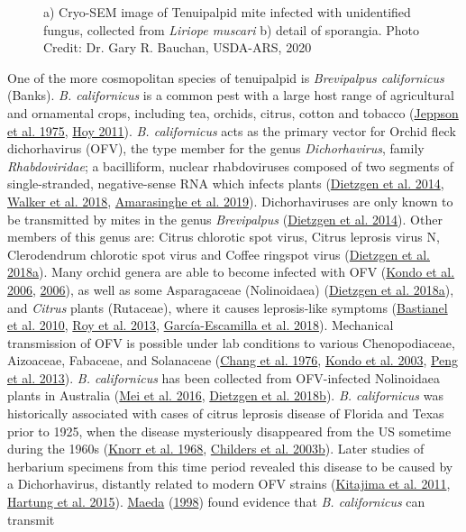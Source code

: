 \documentclass[12pt,final,CPage]{ufthesis}
\begin{document}
{\begin{figure}
  \caption[Cryo-SEM image of Tenuipalpid mite infected with unidentified fungus]{a) Cryo-SEM image of Tenuipalpid mite infected with unidentified fungus, collected from \textit{Liriope muscari} b) detail of sporangia. Photo Credit: Dr. Gary R. Bauchan, USDA-ARS, 2020}\label{fig:brevi-fungus}
  \end{figure}
  One of the more cosmopolitan species of tenuipalpid is \emph{Brevipalpus californicus} (Banks). \emph{B. californicus} is a common pest with a large host range of agricultural and ornamental crops, including tea, orchids, citrus, cotton and tobacco (\protect\hyperlink{ref-Jeppson1975}{Jeppson et al. 1975}, \protect\hyperlink{ref-Hoy2011}{Hoy 2011}). \emph{B. californicus} acts as the primary vector for Orchid fleck dichorhavirus (OFV), the type member for the genus \emph{Dichorhavirus}, family \emph{Rhabdoviridae}; a bacilliform, nuclear rhabdoviruses composed of two segments of single-stranded, negative-sense RNA which infects plants (\protect\hyperlink{ref-Dietzgen2014}{Dietzgen et al. 2014}, \protect\hyperlink{ref-Walker2018}{Walker et al. 2018}, \protect\hyperlink{ref-Amarasinghe2019}{Amarasinghe et al. 2019}). Dichorhaviruses are only known to be transmitted by mites in the genus \emph{Brevipalpus} (\protect\hyperlink{ref-Dietzgen2014}{Dietzgen et al. 2014}). Other members of this genus are: Citrus chlorotic spot virus, Citrus leprosis virus N, Clerodendrum chlorotic spot virus and Coffee ringspot virus (\protect\hyperlink{ref-Dietzgen2018}{Dietzgen et al. 2018a}). Many orchid genera are able to become infected with OFV (\protect\hyperlink{ref-Kondo2006}{Kondo et al. 2006}, \protect\hyperlink{ref-Kondo2006}{2006}), as well as some Asparagaceae (Nolinoidaea) (\protect\hyperlink{ref-Dietzgen2018}{Dietzgen et al. 2018a}), and \emph{Citrus} plants (Rutaceae), where it causes leprosis-like symptoms (\protect\hyperlink{ref-Bastianel2010}{Bastianel et al. 2010}, \protect\hyperlink{ref-Roy2013a}{Roy et al. 2013}, \protect\hyperlink{ref-GarciaEscamilla2018}{García-Escamilla et al. 2018}). Mechanical transmission of OFV is possible under lab conditions to various Chenopodiaceae, Aizoaceae, Fabaceae, and Solanaceae (\protect\hyperlink{ref-Chang1976}{Chang et al. 1976}, \protect\hyperlink{ref-Kondo2003}{Kondo et al. 2003}, \protect\hyperlink{ref-Peng2013}{Peng et al. 2013}). \emph{B. californicus} has been collected from OFV-infected Nolinoidaea plants in Australia (\protect\hyperlink{ref-Mei2016}{Mei et al. 2016}, \protect\hyperlink{ref-Dietzgen2018a}{Dietzgen et al. 2018b}). \emph{B. californicus} was historically associated with cases of citrus leprosis disease of Florida and Texas prior to 1925, when the disease mysteriously disappeared from the US sometime during the 1960s (\protect\hyperlink{ref-Knorr1968b}{Knorr et al. 1968}, \protect\hyperlink{ref-Childers2003}{Childers et al. 2003b}). Later studies of herbarium specimens from this time period revealed this disease to be caused by a Dichorhavirus, distantly related to modern OFV strains (\protect\hyperlink{ref-Kitajima2011a}{Kitajima et al. 2011}, \protect\hyperlink{ref-Hartung2015}{Hartung et al. 2015}). \protect\hyperlink{ref-Maeda1998}{Maeda} (\protect\hyperlink{ref-Maeda1998}{1998}) found evidence that \emph{B. californicus} can transmit }
\end{document}
